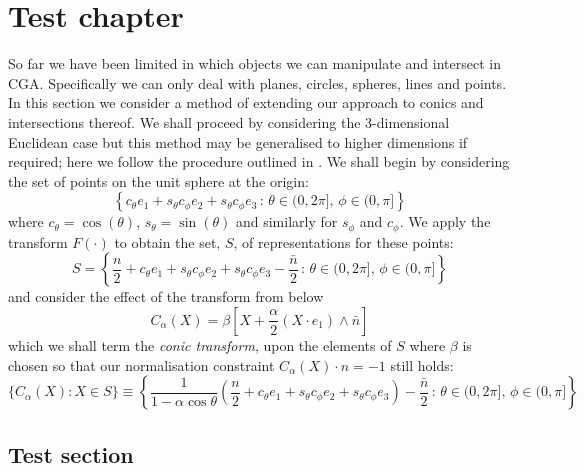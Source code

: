 \chapter{Test chapter}

So far we have been limited in which objects we can manipulate and intersect
in CGA. Specifically we can only deal with planes, circles, spheres, lines and
points. In this section we consider a method of extending our approach to
conics and intersections thereof. We shall proceed by considering the 
3-dimensional Euclidean case but this method may be generalised to higher
dimensions if required; here we follow the procedure outlined in
\cite{anthonyChina}.
We shall begin by considering the set of points on the unit sphere at the 
origin:
\[
\left\{ c_\theta e_1 + s_\theta c_\phi e_2 + s_\theta c_\phi e_3\,:\,
	\theta \in (0,2\pi],\,\phi \in (0,\pi] \right\}
\]
where $c_\theta = \cos(\theta)$, $s_\theta = \sin(\theta)$ and similarly
for $s_\phi$ and $c_\phi$. We apply the transform $F(\cdot)$ to
obtain the set, $S$, of representations for these points:
\[
S = \left\{ \frac{n}{2} + c_\theta e_1 + s_\theta c_\phi e_2
+ s_\theta c_\phi e_3 -
    \frac{\bar{n}}{2} \,:\,
	\theta \in (0,2\pi],\,\phi \in (0,\pi] \right\}
\]
and consider the effect of the transform from \cite{anthonyChina} below 
\[
C_\alpha(X) = \beta \left[ X + \frac{\alpha}{2} (X \cdot e_1) \wedge \bar{n} \right]
\]
which we shall term the \emph{conic transform}, upon the elements of $S$ 
where $\beta$ is chosen so that our normalisation constraint
$C_\alpha(X) \cdot n = -1$ still holds:
\[
\{ C_\alpha(X) : X \in S \} \equiv \left\{ \frac{1}{1 - \alpha \cos \theta} \left(
	\frac{n}{2} + c_\theta e_1 + s_\theta c_\phi e_2 
              + s_\theta c_\phi e_3 \right) -
    \frac{\bar{n}}{2} \,:\,
	\theta \in (0,2\pi],\,\phi \in (0,\pi] \right\}
\]

\section{Test section}

